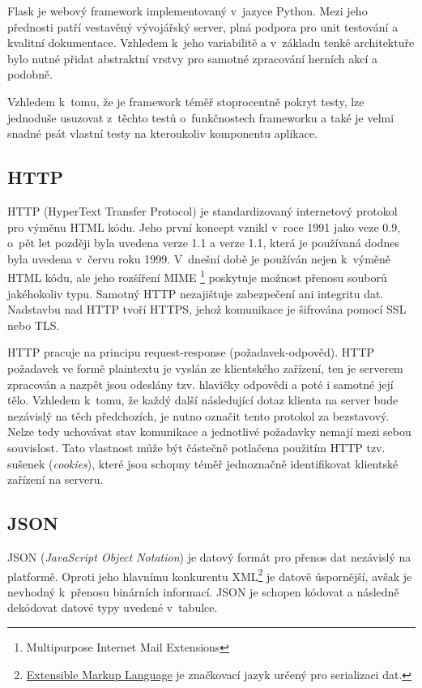 Flask je webový framework implementovaný v~jazyce Python. Mezi jeho přednosti patří vestavěný vývojářský server, plná podpora pro unit testování a kvalitní dokumentace. Vzhledem k~jeho variabilitě a v~základu tenké architektuře bylo nutné přidat abstraktní vrstvy pro samotné zpracování herních akcí a podobně.

Vzhledem k~tomu, že je framework téměř stoprocentně pokryt testy, lze jednoduše usuzovat z~těchto testů o~funkčnostech frameworku a také je velmi snadné psát vlastní testy na kteroukoliv komponentu aplikace.

\subsection{HTTP}
\label{subsec:http}
\begin{sloppypar}
	HTTP (HyperText Transfer Protocol) je standardizovaný internetový protokol pro výměnu HTML kódu. Jeho první koncept vznikl v~roce 1991 jako veze 0.9, o~pět let později byla uvedena verze 1.1 a verze 1.1, která je používaná dodnes byla uvedena v~červu roku 1999. V~dnešní době je používán nejen k~výměně HTML kódu, ale jeho rozšíření MIME \footnote{Multipurpose Internet Mail Extensions} poskytuje možnost přenosu souborů jakéhokoliv typu. Samotný HTTP nezajištuje zabezpečení ani integritu dat. Nadstavbu nad HTTP tvoří HTTPS, jehož komunikace je šifrována pomocí SSL nebo TLS.

	HTTP pracuje na principu request-response (požadavek-odpověd). HTTP požadavek ve formě plaintextu je vyslán ze klientského zařízení, ten je serverem zpracován a nazpět jsou odeslány tzv. hlavičky odpovědi a poté i samotné její tělo. Vzhledem k~tomu, že každý další následující dotaz klienta na server bude nezávislý na těch předchozích, je nutno označit tento protokol za bezstavový. Nelze tedy uchovávat stav komunikace a jednotlivé požadavky nemají mezi sebou souvislost. Tato vlastnost může být částečně potlačena použitím HTTP tzv. sušenek (\emph{cookies}), které jsou schopny téměř jednoznačně identifikovat klientské zařízení na serveru.
\end{sloppypar}

\subsection{JSON}
\label{subsec:json}

JSON (\emph{JavaScript Object Notation}) je datový formát pro přenos dat nezávislý na platformě. Oproti jeho hlavnímu konkurentu XML\footnote{\href{https://cs.wikipedia.org/wiki/Extensible_Markup_Language}{Extensible Markup Language} je značkovací jazyk určený pro serializaci dat.} je datově úspornější, avšak je nevhodný k~přenosu binárních informací. JSON je schopen kódovat a následně dekódovat datové typy uvedené v~tabulce.

